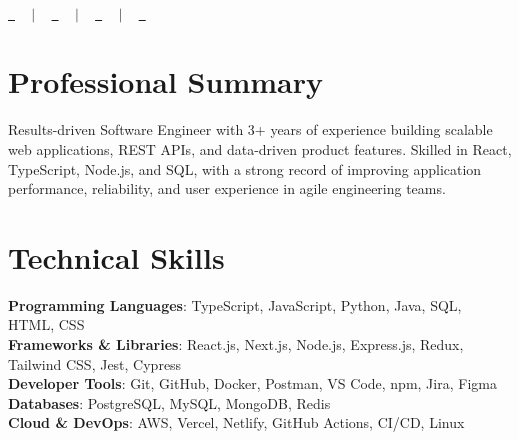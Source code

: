 \documentclass[letterpaper,11pt]{article}
\begin{document}
\begin{center}
    {\Huge \scshape \ResumeName} \\ \vspace{8pt}
    
    \small 
    \href{tel:\ResumePhoneLink}{\raisebox{-0.1\height}\faPhone\ \underline{\ResumePhoneDisplay}} ~ $|$ ~
    \href{mailto:\ResumeEmail}{\raisebox{-0.2\height}\faEnvelope\ \underline{\ResumeEmail}} ~ $|$ ~
    \href{\ResumeLinkedInUrl}{\raisebox{-0.2\height}\faLinkedin\ \underline{\ResumeLinkedInDisplay}} ~ $|$ ~
    \href{\ResumeGitHubUrl}{\raisebox{-0.2\height}\faGithub\ \underline{\ResumeGitHubDisplay}}
    
    \vspace{-8pt}
\end{center}

\section{Professional Summary}
\begin{justify}
\small{Results-driven Software Engineer with 3+ years of experience building scalable web applications, REST APIs, and data-driven product features. Skilled in React, TypeScript, Node.js, and SQL, with a strong record of improving application performance, reliability, and user experience in agile engineering teams.}
\end{justify}
\vspace{-10pt}

\section{Technical Skills}
\begin{itemize}[leftmargin=0.15in, label={}]
    \small{\item{
        \textbf{Programming Languages}{: TypeScript, JavaScript, Python, Java, SQL, HTML, CSS} \\
        \textbf{Frameworks \& Libraries}{: React.js, Next.js, Node.js, Express.js, Redux, Tailwind CSS, Jest, Cypress} \\
        \textbf{Developer Tools}{: Git, GitHub, Docker, Postman, VS Code, npm, Jira, Figma} \\
        \textbf{Databases}{: PostgreSQL, MySQL, MongoDB, Redis} \\
        \textbf{Cloud \& DevOps}{: AWS, Vercel, Netlify, GitHub Actions, CI/CD, Linux}
    }}
\end{itemize}
\vspace{-16pt}
\end{document}
